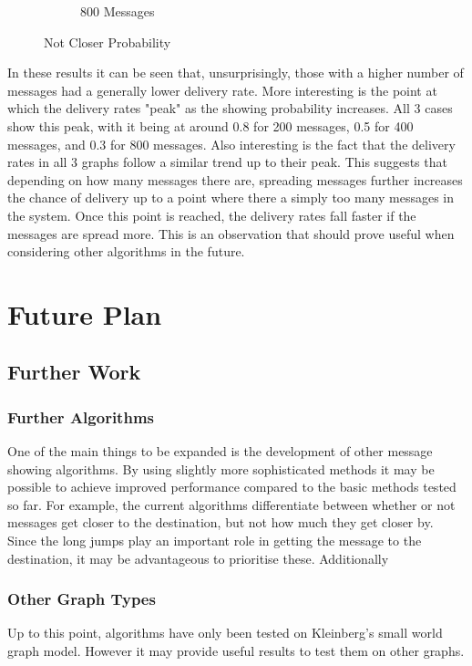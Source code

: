 \documentclass[bsc,frontabs,twoside,singlespacing,parskip,deptreport]{infthesis}     %
\begin{document}
\begin{figure}[h]
\begin{subfigure}[b]{0.3\textwidth}
        \caption{800 Messages}
        \label{fig:results/notCloserProb_800messages}
    \end{subfigure}
  	\vspace{-5pt}
    \caption{Not Closer Probability}\label{fig:NotCloserProbability}
  	\vspace{-5pt}
\end{figure}

In these results it can be seen that, unsurprisingly, those with a higher number of messages had a generally lower delivery rate. More interesting is the point at which the delivery rates "peak" as the showing probability increases. All 3 cases show this peak, with it being at around 0.8 for 200 messages, 0.5 for 400 messages, and 0.3 for 800 messages. Also interesting is the fact that the delivery rates in all 3 graphs follow a similar trend up to their peak. This suggests that depending on how many messages there are, spreading messages further increases the chance of delivery up to a point where there a simply too many messages in the system. Once this point is reached, the delivery rates fall faster if the messages are spread more. This is an observation that should prove useful when considering other algorithms in the future.


\chapter{Future Plan}
\section{Further Work}

\subsection{Further Algorithms}
One of the main things to be expanded is the development of other message showing algorithms. By using slightly more sophisticated methods it may be possible to achieve improved performance compared to the basic methods tested so far. For example, the current algorithms differentiate between whether or not messages get closer to the destination, but not how much they get closer by. Since the long jumps play an important role in getting the message to the destination, it may be advantageous to prioritise these. Additionally 

\subsection{Other Graph Types}
Up to this point, algorithms have only been tested on Kleinberg's small world graph model. However it may provide useful results to test them on other graphs. 
\end{document}
